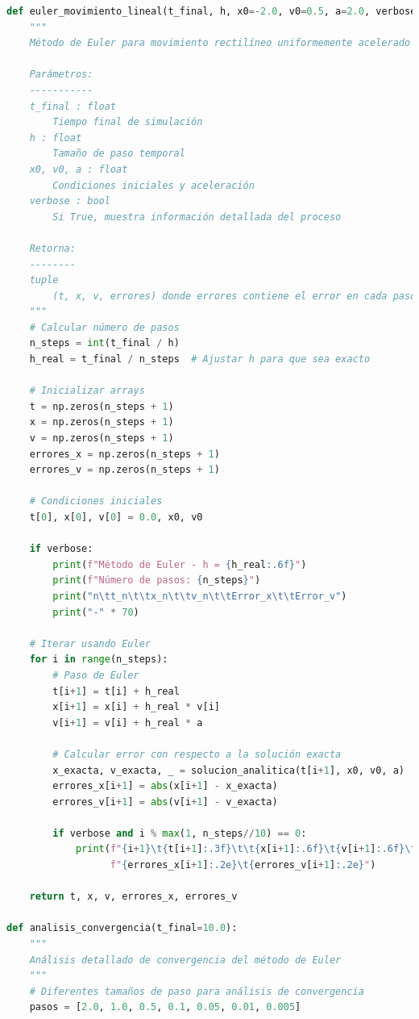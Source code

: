 \documentclass{article}
\begin{document}
	\begin{lstlisting}[language=Python, caption={Implementación detallada del método de Euler}]
def euler_movimiento_lineal(t_final, h, x0=-2.0, v0=0.5, a=2.0, verbose=False):
    """
    Método de Euler para movimiento rectilíneo uniformemente acelerado
    
    Parámetros:
    -----------
    t_final : float
        Tiempo final de simulación
    h : float  
        Tamaño de paso temporal
    x0, v0, a : float
        Condiciones iniciales y aceleración
    verbose : bool
        Si True, muestra información detallada del proceso
        
    Retorna:
    --------
    tuple
        (t, x, v, errores) donde errores contiene el error en cada paso
    """
    # Calcular número de pasos
    n_steps = int(t_final / h)
    h_real = t_final / n_steps  # Ajustar h para que sea exacto
    
    # Inicializar arrays
    t = np.zeros(n_steps + 1)
    x = np.zeros(n_steps + 1)
    v = np.zeros(n_steps + 1)
    errores_x = np.zeros(n_steps + 1)
    errores_v = np.zeros(n_steps + 1)
    
    # Condiciones iniciales
    t[0], x[0], v[0] = 0.0, x0, v0
    
    if verbose:
        print(f"Método de Euler - h = {h_real:.6f}")
        print(f"Número de pasos: {n_steps}")
        print("n\tt_n\t\tx_n\t\tv_n\t\tError_x\t\tError_v")
        print("-" * 70)
    
    # Iterar usando Euler
    for i in range(n_steps):
        # Paso de Euler
        t[i+1] = t[i] + h_real
        x[i+1] = x[i] + h_real * v[i]
        v[i+1] = v[i] + h_real * a
        
        # Calcular error con respecto a la solución exacta
        x_exacta, v_exacta, _ = solucion_analitica(t[i+1], x0, v0, a)
        errores_x[i+1] = abs(x[i+1] - x_exacta)
        errores_v[i+1] = abs(v[i+1] - v_exacta)
        
        if verbose and i % max(1, n_steps//10) == 0:
            print(f"{i+1}\t{t[i+1]:.3f}\t\t{x[i+1]:.6f}\t{v[i+1]:.6f}\t"
                  f"{errores_x[i+1]:.2e}\t{errores_v[i+1]:.2e}")
    
    return t, x, v, errores_x, errores_v

def analisis_convergencia(t_final=10.0):
    """
    Análisis detallado de convergencia del método de Euler
    """
    # Diferentes tamaños de paso para análisis de convergencia
    pasos = [2.0, 1.0, 0.5, 0.1, 0.05, 0.01, 0.005]
    

\end{lstlisting}
\end{document}
